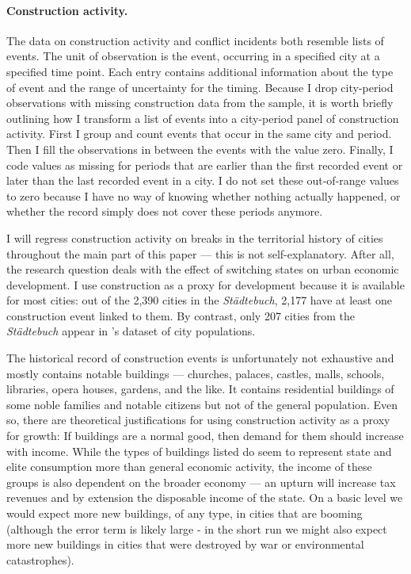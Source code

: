 \documentclass[11pt, a4paper]{article}
\begin{document}
\paragraph{Construction activity.}

The data on construction activity \citep{pt5} and conflict incidents \citep{pt6} both resemble lists of events. The unit of observation is the event, occurring in a specified city at a specified time point. Each entry contains additional information about the type of event and the range of uncertainty for the timing. Because I drop city-period observations with missing construction data from the sample, it is worth briefly outlining how I transform a list of events into a city-period panel of construction activity. First I group and count events that occur in the same city and period. Then I fill the observations in between the events with the value zero. Finally, I code values as missing for periods that are earlier than the first recorded event or later than the last recorded event in a city. I do not set these out-of-range values to zero because I have no way of knowing whether nothing actually happened, or whether the record simply does not cover these periods anymore.

I will regress construction activity on breaks in the territorial history of cities throughout the main part of this paper --- this is not self-explanatory. After all, the research question deals with the effect of switching states on urban economic development. I use construction as a proxy for development because it is available for most cities: out of the 2,390 cities in the \textit{Städtebuch}, 2,177 have at least one construction event linked to them. By contrast, only 207 cities from the \textit{Städtebuch} appear in \cite{bairoch1988}'s dataset of city populations.

The historical record of construction events is unfortunately not exhaustive and mostly contains notable buildings --- churches, palaces, castles, malls, schools, libraries, opera houses, gardens, and the like. It contains residential buildings of some noble families and notable citizens but not of the general population. Even so, there are theoretical justifications for using construction activity as a proxy for growth: If buildings are a normal good, then demand for them should increase with income. While the types of buildings listed do seem to represent state and elite consumption more than general economic activity, the income of these groups is also dependent on the broader economy --- an upturn will increase tax revenues and by extension the disposable income of the state. On a basic level we would expect more new buildings, of any type, in cities that are booming (although the error term is likely large - in the short run we might also expect more new buildings in cities that were destroyed by war or environmental catastrophes).
\end{document}
